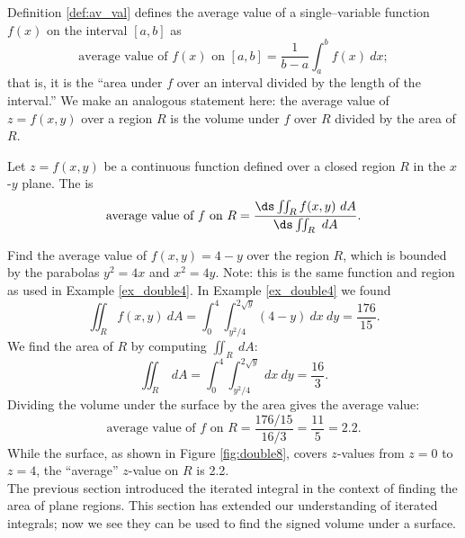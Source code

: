 Definition \ref{def:av_val} defines the average value of a single--variable function $f(x)$ on the interval $[a,b]$ as
$$\text{average value of $f(x)$ on $[a,b]$} = \frac1{b-a}\int_a^b f(x)\ dx;$$
that is, it is the ``area under $f$ over an interval divided by the length of the interval.'' We make an analogous statement here: the average value of $z=f(x,y)$ over a region $R$ is the volume under $f$ over $R$ divided by the area of $R$.

{Let $z=f(x,y)$ be a continuous function defined over a closed region $R$ in the $x$-$y$ plane. The  is 
$$\text{average value of $f$ on $R$} = \frac{\ds \iint_R f(x,y)\ dA}{\ds\iint_R \ dA}.$$
}

{Find the average value of $f(x,y) = 4-y$ over the region $R$, which is bounded by the parabolas $y^2=4x$ and $x^2=4y$. Note: this is the same function and region as used in Example \ref{ex_double4}.
}
{In Example \ref{ex_double4} we found 
$$\iint_R f(x,y)\ dA = \int_0^4\int_{y^2/4}^{2\sqrt{y}}(4-y)\ dx\ dy = \frac{176}{15}.$$ 
We find the area of $R$ by computing $\iint_R \ dA$:
$$\iint_R \ dA = \int_0^4\int_{y^2/4}^{2\sqrt{y}} \ dx\ dy = \frac{16}{3}.$$
Dividing the volume under the surface by the area gives the average value:
$$\text{average value of $f$ on $R$} = \frac{176/15}{16/3} = \frac{11}5 = 2.2.$$
While the surface, as shown in Figure \ref{fig:double8}, covers $z$-values from $z=0$ to $z=4$, the ``average'' $z$-value on $R$ is 2.2.
}\\

The previous section introduced the iterated integral in the context of finding the area of plane regions. This section has extended our understanding of iterated integrals; now we see they can be used to find the signed volume under a surface. 

